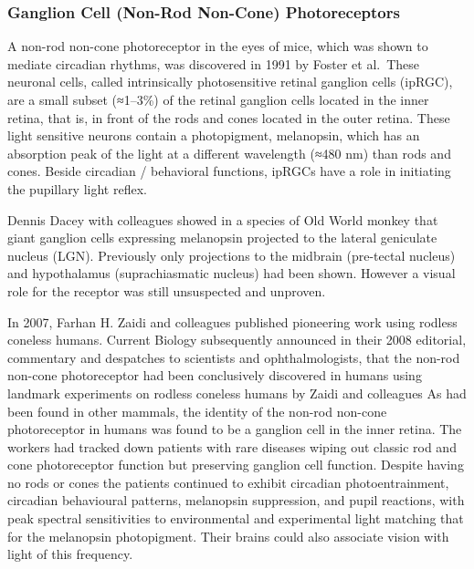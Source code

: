 \hypertarget{ganglion-cell-non-rod-non-cone-photoreceptors}{%
\subsubsection{Ganglion Cell (Non-Rod Non-Cone) Photoreceptors}\label{ganglion-cell-non-rod-non-cone-photoreceptors}}

A non-rod non-cone photoreceptor in the eyes of mice, which was shown to mediate circadian rhythms, was discovered in 1991 by Foster et al.~These neuronal cells, called intrinsically photosensitive retinal ganglion cells (ipRGC), are a small subset (≈1--3\%) of the retinal ganglion cells located in the inner retina, that is, in front of the rods and cones located in the outer retina. These light sensitive neurons contain a photopigment, melanopsin, which has an absorption peak of the light at a different wavelength (≈480 nm) than rods and cones. Beside circadian / behavioral functions, ipRGCs have a role in initiating the pupillary light reflex.

Dennis Dacey with colleagues showed in a species of Old World monkey that giant ganglion cells expressing melanopsin projected to the lateral geniculate nucleus (LGN). Previously only projections to the midbrain (pre-tectal nucleus) and hypothalamus (suprachiasmatic nucleus) had been shown. However a visual role for the receptor was still unsuspected and unproven.

In 2007, Farhan H. Zaidi and colleagues published pioneering work using rodless coneless humans. Current Biology subsequently announced in their 2008 editorial, commentary and despatches to scientists and ophthalmologists, that the non-rod non-cone photoreceptor had been conclusively discovered in humans using landmark experiments on rodless coneless humans by Zaidi and colleagues As had been found in other mammals, the identity of the non-rod non-cone photoreceptor in humans was found to be a ganglion cell in the inner retina. The workers had tracked down patients with rare diseases wiping out classic rod and cone photoreceptor function but preserving ganglion cell function. Despite having no rods or cones the patients continued to exhibit circadian photoentrainment, circadian behavioural patterns, melanopsin suppression, and pupil reactions, with peak spectral sensitivities to environmental and experimental light matching that for the melanopsin photopigment. Their brains could also associate vision with light of this frequency.

